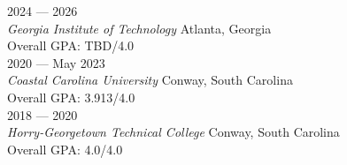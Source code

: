 	\hfill 2024 --- 2026 \\
\textit{Georgia Institute of Technology}    \hfill Atlanta, Georgia \\ 
Overall GPA: TBD/4.0 \\
	\hfill 2020 --- May 2023 \\
\textit{Coastal Carolina University}    \hfill Conway, South Carolina \\ 
Overall GPA: 3.913/4.0 \\
   \hfill	2018 --- 2020 \\ 
\textit{Horry-Georgetown Technical College} \hfill Conway, South Carolina \\ 
Overall GPA: 4.0/4.0 \\
